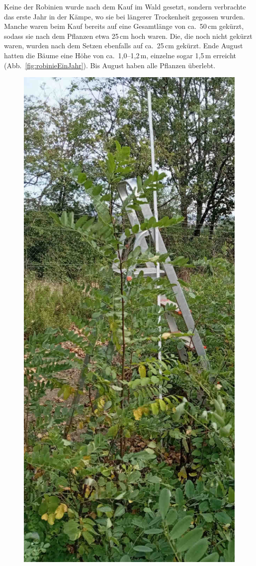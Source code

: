 \documentclass[twocolumn]{scrartcl}
\begin{document}
Keine der Robinien wurde nach dem Kauf im Wald gesetzt, sondern
verbrachte das erste Jahr in der Kämpe, wo sie bei längerer
Trockenheit gegossen wurden. Manche waren beim Kauf bereits auf eine
Gesamtlänge von ca.~50\,cm gekürzt, sodass sie nach dem Pflanzen etwa
25\,cm hoch waren. Die, die noch nicht gekürzt waren, wurden nach dem
Setzen ebenfalls auf ca.~25\,cm gekürzt. Ende August hatten die Bäume
eine Höhe von ca.~1,0--1,2\,m, einzelne sogar 1,5\,m erreicht
(Abb.~\ref{fig:robinieEinJahr}). Bis August haben alle Pflanzen
überlebt.

\begin{figure}[htbp]
  \centering
  \includegraphics[width=.9\linewidth]{./bild/robinieEinJahr}

\end{figure}
\end{document}
